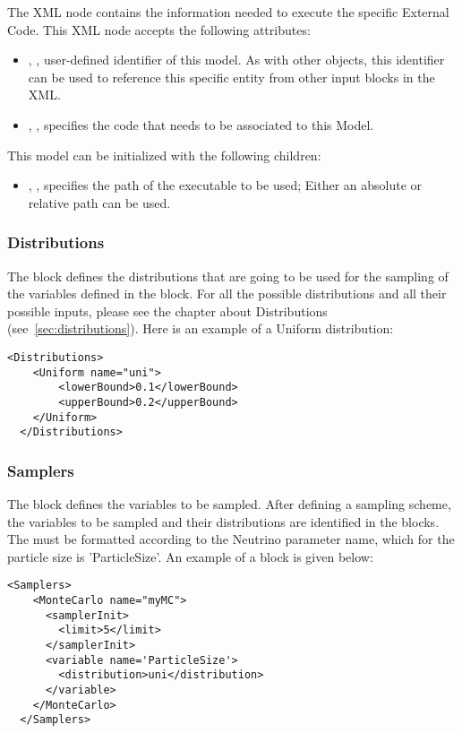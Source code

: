 The  XML node contains the information needed to execute the specific External Code. This
XML node accepts the following attributes:
\begin{itemize}
  \item {}, , user-defined identifier of this model.
    \nb As with other objects, this identifier can be used to reference this specific entity from other input
    blocks in the XML.
  \item {}, , specifies the code that needs to be
    associated to this Model.
\end{itemize}
This model can be initialized with the following children:
\begin{itemize}
  \item {}, , specifies the path of the executable to
    be used; \nb Either an absolute or relative path can be used.
\end{itemize}


\subsubsection{Distributions}
The  block defines the distributions that are going to be used for the sampling
of the variables defined in the  block. For all the possible distributions and all
their possible inputs, please see the chapter about Distributions (see~\ref{sec:distributions}). Here is an example of a
Uniform distribution:
\begin{lstlisting}[style=XML]
  <Distributions>
    <Uniform name="uni">
        <lowerBound>0.1</lowerBound>
        <upperBound>0.2</upperBound>
    </Uniform>
  </Distributions>
\end{lstlisting}
%
\subsubsection{Samplers}
The  block defines the variables to be sampled. After defining a sampling scheme, the variables to be sampled and
their distributions are identified in the  blocks.
The  must be formatted according to the Neutrino parameter name, which for the particle size is
'ParticleSize'.
An example of a  block is given below:
\begin{lstlisting}[style=XML]
 <Samplers>
    <MonteCarlo name="myMC">
      <samplerInit>
        <limit>5</limit>
      </samplerInit>
      <variable name='ParticleSize'>
        <distribution>uni</distribution>
      </variable>
    </MonteCarlo>
  </Samplers>
\end{lstlisting}

